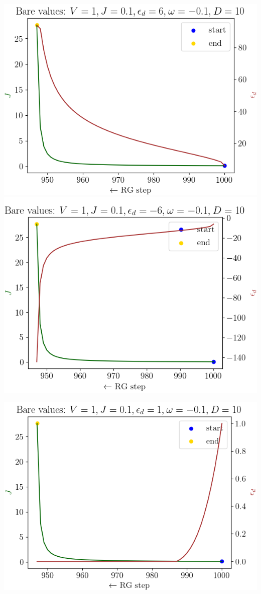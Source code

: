 \documentclass[12pt,twoside]{article}
\numberwithin{equation}{section}
\begin{document}
{\begin{center}
	\includegraphics[scale=0.38]{../figures/ed_to_large1.png}
	\includegraphics[scale=0.38]{../figures/ed_to_large2.png}
	\label{flowup}
\end{center}
\begin{center}
	\includegraphics[scale=0.38]{../figures/ed_to_zero1.png}

\end{center}}
\end{document}
